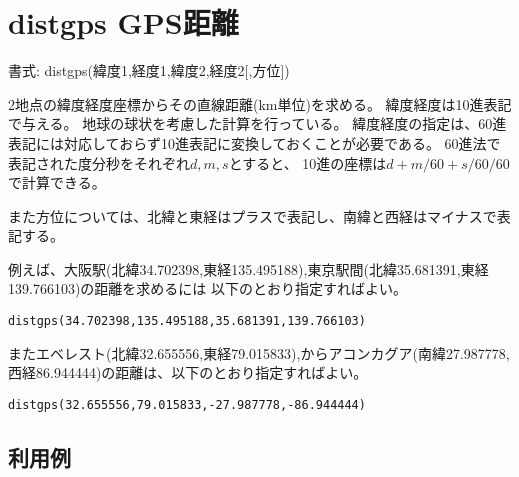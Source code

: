 
% 

\section{distgps GPS距離\label{sect:distgps}}

書式: distgps(緯度1,経度1,緯度2,経度2[,方位])

2地点の緯度経度座標からその直線距離(km単位)を求める。
緯度経度は10進表記で与える。
地球の球状を考慮した計算を行っている。
緯度経度の指定は、60進表記には対応しておらず10進表記に変換しておくことが必要である。
60進法で表記された度分秒をそれぞれ$d,m,s$とすると、
10進の座標は$d+m/60+s/60/60$で計算できる。

また方位については、北緯と東経はプラスで表記し、南緯と西経はマイナスで表記する。

例えば、大阪駅(北緯34.702398,東経135.495188),東京駅間(北緯35.681391,東経139.766103)の距離を求めるには
以下のとおり指定すればよい。
\begin{verbatim}
distgps(34.702398,135.495188,35.681391,139.766103)
\end{verbatim}
またエベレスト(北緯32.655556,東経79.015833),からアコンカグア(南緯27.987778,西経86.944444)の距離は、以下のとおり指定すればよい。
\begin{verbatim}
distgps(32.655556,79.015833,-27.987778,-86.944444)
\end{verbatim}


\subsection*{利用例}


%

